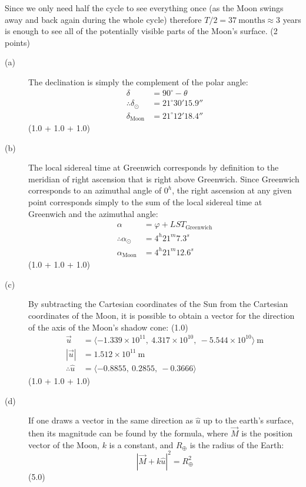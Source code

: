 \begin{description}
  Since we only need half the cycle to see everything once (as the Moon swings
  away and back again during the whole cycle) therefore
  $T/2 = 37\ \mathrm{months} \approx 3$ years is enough to see all of the
  potentially visible parts of the Moon's surface.
  \hfill(2 points)
\end{description}

\begin{description}
\item[(a)] The declination is simply the complement of the polar angle:
  \begin{align*}
    \delta &= 90^\circ - \theta\\
    \therefore \delta_\odot &= 21^\circ 30' 15.9''\\
    \delta_{\mathrm{Moon}} &= 21^\circ 12' 18.4''
  \end{align*}
  \hfill(1.0 + 1.0 + 1.0)

\item[(b)] The local sidereal time at Greenwich corresponds by definition to
  the meridian of right ascension that is right above Greenwich. Since
  Greenwich corresponds to an azimuthal angle of $0^h$, the right ascension at
  any given point corresponds simply to the sum of the local sidereal time at
  Greenwich and the azimuthal angle:
  \begin{align*}
    \alpha &= \varphi + LST_{\mathrm{Greenwich}}\\
    \therefore \alpha_\odot &= 4^h 21^m 7.3^s\\
    \alpha_{\mathrm{Moon}} &= 4^h 21^m 12.6^s
  \end{align*}
  \hfill(1.0 + 1.0 + 1.0)

\item[(c)] By subtracting the Cartesian coordinates of the Sun from the
  Cartesian coordinates of the Moon, it is possible to obtain a vector for the
  direction of the axis of the Moon's shadow cone:
  \hfill(1.0)
  \begin{align*}
    \vec{u} &= \langle -1.339 \times 10^{11},\ 4.317 \times 10^{10},\
                       -5.544 \times 10^{10} \rangle\ \mathrm{m}\\
    |\vec{u}| &= 1.512 \times 10^{11}\ \mathrm{m}\\
    \therefore \hat{u} &= \langle -0.8855,\ 0.2855,\ -0.3666 \rangle
  \end{align*}
  \hfill(1.0 + 1.0 + 1.0)

\item[(d)] If one draws a vector in the same direction as $\hat{u}$ up to the
  earth's surface, then its magnitude can be found by the formula, where
  $\vec{M}$ is the position vector of the Moon, $k$ is a constant, and
  $R_\oplus$ is the radius of the Earth:
  \[
    |\vec{M} + k\hat{u}|^2 = R_\oplus^2
  \]
  \hfill(5.0)


\end{description}
